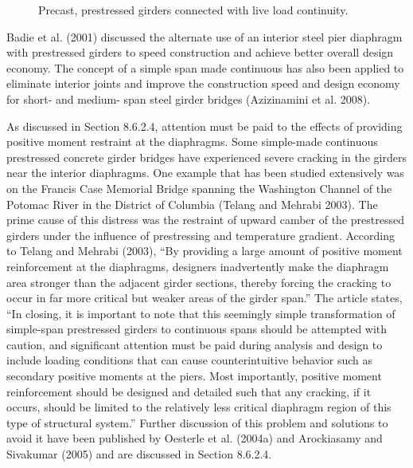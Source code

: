\begin{figure}
  \caption{Precast, prestressed girders connected with live load continuity.}
  \label{fig:continuity-live-load-connection}
\end{figure}

Badie et al. (2001) discussed the alternate use of an interior steel pier diaphragm with prestressed girders to speed
construction and achieve better overall design economy. The concept of a simple span made continuous has also been applied to eliminate interior joints and improve the construction speed and design economy for short- and medium-
span steel girder bridges (Azizinamini et al. 2008).

As discussed in Section 8.6.2.4, attention must be paid to the effects of providing positive moment restraint at the
diaphragms. Some simple-made continuous prestressed concrete girder bridges have experienced severe cracking in
the girders near the interior diaphragms. One example that has been studied extensively was on the Francis Case
Memorial Bridge spanning the Washington Channel of the Potomac River in the District of Columbia (Telang and
Mehrabi 2003). The prime cause of this distress was the restraint of upward camber of the prestressed girders under
the influence of prestressing and temperature gradient. According to Telang and Mehrabi (2003), “By providing a
large amount of positive moment reinforcement at the diaphragms, designers inadvertently make the diaphragm area
stronger than the adjacent girder sections, thereby forcing the cracking to occur in far more critical but weaker areas
of the girder span.” The article states, “In closing, it is important to note that this seemingly simple transformation of
simple-span prestressed girders to continuous spans should be attempted with caution, and significant attention must
be paid during analysis and design to include loading conditions that can cause counterintuitive behavior such as
secondary positive moments at the piers. Most importantly, positive moment reinforcement should be designed and
detailed such that any cracking, if it occurs, should be limited to the relatively less critical diaphragm region of this
type of structural system.” Further discussion of this problem and solutions to avoid it have been published by
Oesterle et al. (2004a) and Arockiasamy and Sivakumar (2005) and are discussed in Section 8.6.2.4.

